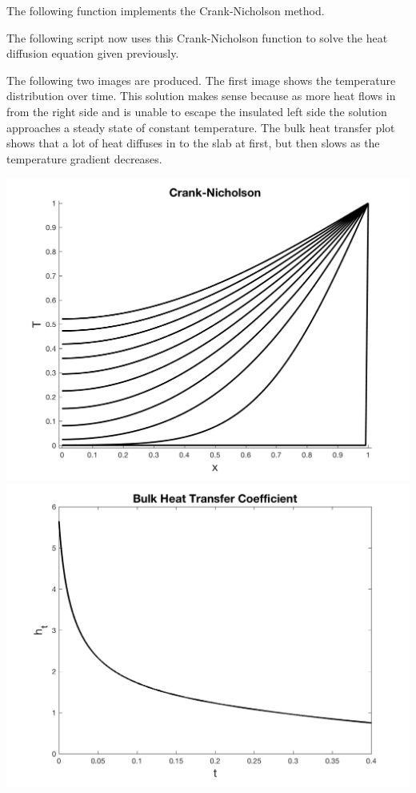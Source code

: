 \documentclass[11pt, oneside]{article}
\begin{document}
\begin{enumerate}
\begin{enumerate}
        The following function implements the Crank-Nicholson method.
        

        The following script now uses this Crank-Nicholson function to solve
        the heat diffusion equation given previously.
        
        The following two images are produced.
        The first image shows the temperature distribution over time.
        This solution makes sense because as more heat flows in from the right
        side and is unable to escape the insulated left side the solution
        approaches a steady state of constant temperature.
        The bulk heat transfer plot shows that a lot of heat diffuses in to the
        slab at first, but then slows as the temperature gradient decreases.
        \begin{center}
          \includegraphics[scale=0.5]{Figures/03_05.png}
          \includegraphics[scale=0.5]{Figures/03_06.png}
        \end{center}
    \end{enumerate}


\end{enumerate}
\end{document}
